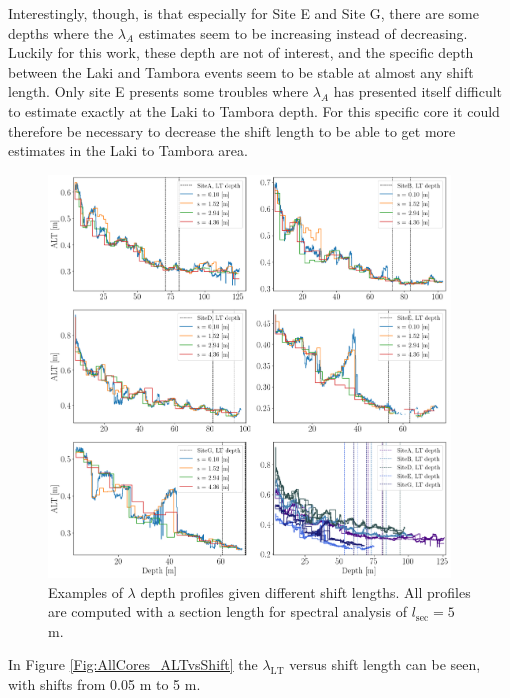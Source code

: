 \documentclass[../../CompleteThesis2/Complete_2ndDraft]{subfiles}
\begin{document}
Interestingly, though, is that especially for Site E and Site G, there are some depths where the $\lambda_A$ estimates seem to be increasing instead of decreasing. Luckily for this work, these depth are not of interest, and the specific depth between the Laki and Tambora events seem to be stable at almost any shift length. Only site E presents some troubles where $\lambda_A$ has presented itself difficult to estimate exactly at the Laki to Tambora depth. For this specific core it could therefore be necessary to decrease the shift length to be able to get more estimates in the Laki to Tambora area.
\begin{figure}[h]
	\centering
	\includegraphics[width=0.95\textwidth]{AllCores_ALT_at_DiffShifts.png}
	\caption[$\lambda$ Depth Profiles, Different $s_{\text{sec}}$]{\small Examples of $\lambda$ depth profiles given different shift lengths. All profiles are computed with a section length for spectral analysis of $l_{\text{sec}}=5$ m.}
	\label{fig:AllCores_ALT_at_DiffShifts}
\end{figure}

In Figure \ref{Fig:AllCores_ALTvsShift} the $\lambda_{\text{LT}}$ versus shift length can be seen, with shifts from 0.05 m to 5 m.
\end{document}

